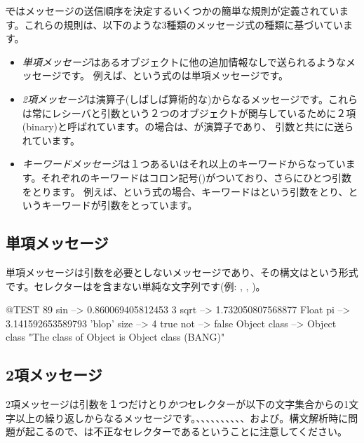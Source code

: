 \documentclass[a4paper,10pt,twoside]{book}
\begin{document}
\st ではメッセージの送信順序を決定するいくつかの簡単な規則が定義されています。これらの規則は、以下のような3種類のメッセージ式の種類に基づいています。
\begin{itemize}
\item \emph{単項メッセージ}はあるオブジェクトに他の追加情報なしで送られるようなメッセージです。 例えば、という式のは単項メッセージです。
\item  \emph{2項メッセージ}は演算子(しばしば算術的な)からなるメッセージです。これらは常にレシーバと引数という２つのオブジェクトが関与しているために２項(binary)と呼ばれています。の場合は、\ct{+}が演算子であり、 引数と共にに送られています。
\item  \emph{キーワードメッセージ}は１つあるいはそれ以上のキーワードからなっています。それぞれのキーワードはコロン記号(\ct{:})がついており、さらにひとつ引数をとります。
例えば、という式の場合、キーワードはという引数をとり、というキーワードが引数をとっています。
\end{itemize}

\subsection{単項メッセージ}
単項メッセージは引数を必要としないメッセージであり、その構文はという形式です。セレクターは\ct{:}を含まない単純な文字列です(例: , , )。
\begin{code}{@TEST}
89 sin           --> 0.860069405812453
3 sqrt           --> 1.732050807568877
Float pi         --> 3.141592653589793
'blop' size     --> 4
true not        --> false
Object class --> Object class  "The class of Object is Object class (BANG)"
\end{code}


\subsection{2項メッセージ} 
2項メッセージは引数を１つだけとり\emph{かつ}セレクターが以下の文字集合からの1文字以上の繰り返しからなるメッセージです。\ct{+}、\ct{-}、\ct{*}、\ct{/}、\ct{\&}、\ct{=}、\ct{>}、\ct{|}、\ct{<}、\ct{\~}、および。構文解析時に問題が起こるので、\ct{--}は不正なセレクターであるということに注意してください。
\end{document}
